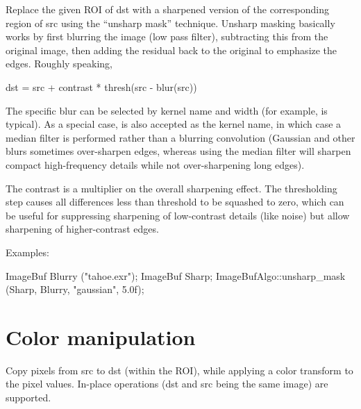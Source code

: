 Replace the given ROI of {\cf dst} with a sharpened version of the
corresponding region of {\cf src} using the ``unsharp mask'' technique.
Unsharp masking basically works by first blurring the image (low
pass filter), subtracting this from the original image, then
adding the residual back to the original to emphasize the edges.
Roughly speaking,

\begin{code}
     dst = src + contrast * thresh(src - blur(src))
\end{code}

The specific blur can be selected by kernel name and width (for example,
 is typical). As a special case,  is also accepted
as the kernel name, in which case a median filter is performed rather than
a blurring convolution (Gaussian and other blurs sometimes over-sharpen edges,
whereas using the median filter will sharpen compact high-frequency details
while not over-sharpening long edges).

The {\cf contrast} is a multiplier on the overall sharpening effect.  The
thresholding step causes all differences less than {\cf threshold} to be
squashed to zero, which can be useful for suppressing sharpening of
low-contrast details (like noise) but allow sharpening of
higher-contrast edges.

\smallskip
\noindent Examples:
\begin{code}
    ImageBuf Blurry ("tahoe.exr");
    ImageBuf Sharp;
    ImageBufAlgo::unsharp_mask (Sharp, Blurry, "gaussian", 5.0f);
\end{code}
\apiend


\section{Color manipulation}
\label{sec:iba:color}

 
Copy pixels from {\cf src} to {\cf dst} (within the ROI), while
applying a color transform to the pixel values.
In-place operations ({\cf dst} and {\cf src} being the same image)
are supported.

